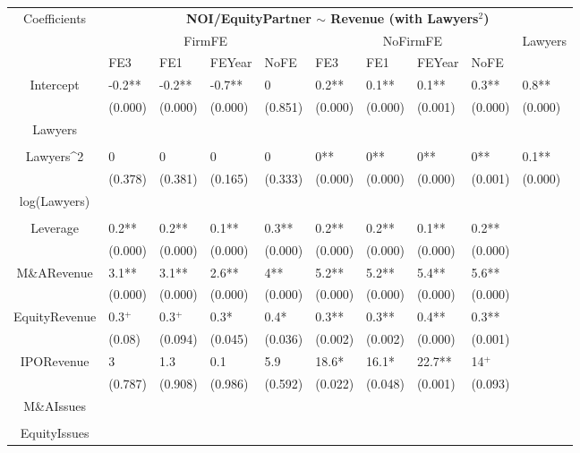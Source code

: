 \documentclass{article}
\begin{document}
\begin{table}[H]
\centering
\begin{tabular}{|clllllllll|}
\hline
\multirow{3}{*}{Coefficients} & \multicolumn{9}{c|}{\textbf{NOI/EquityPartner $\sim$ Revenue (with Lawyers$^2$)}} \\
\cline{2-10}
& \multicolumn{4}{c}{FirmFE} & \multicolumn{4}{c}{NoFirmFE} & \multirow{2}{*}{Lawyers} \\
\cline{2-9}
& FE3 & FE1 & FEYear & NoFE & FE3 & FE1 & FEYear & NoFE &  \\
\hline
 
Intercept & -0.2** & -0.2** & -0.7** & 0 & 0.2** & 0.1** & 0.1** & 0.3** & 0.8** \\ 
   & (0.000) & (0.000) & (0.000) & (0.851) & (0.000) & (0.000) & (0.001) & (0.000) & (0.000) \\ 
  Lawyers &  &  &  &  &  &  &  &  &  \\ 
   &  &  &  &  &  &  &  &  &  \\ 
  Lawyers^2 & 0 & 0 & 0 & 0 & 0** & 0** & 0** & 0** & 0.1** \\ 
   & (0.378) & (0.381) & (0.165) & (0.333) & (0.000) & (0.000) & (0.000) & (0.001) & (0.000) \\ 
  log(Lawyers) &  &  &  &  &  &  &  &  &  \\ 
   &  &  &  &  &  &  &  &  &  \\ 
  Leverage & 0.2** & 0.2** & 0.1** & 0.3** & 0.2** & 0.2** & 0.1** & 0.2** &  \\ 
   & (0.000) & (0.000) & (0.000) & (0.000) & (0.000) & (0.000) & (0.000) & (0.000) &  \\ 
  M\&ARevenue & 3.1** & 3.1** & 2.6** & 4** & 5.2** & 5.2** & 5.4** & 5.6** &  \\ 
   & (0.000) & (0.000) & (0.000) & (0.000) & (0.000) & (0.000) & (0.000) & (0.000) &  \\ 
  EquityRevenue & 0.3$^{+}$ & 0.3$^{+}$ & 0.3* & 0.4* & 0.3** & 0.3** & 0.4** & 0.3** &  \\ 
   & (0.08) & (0.094) & (0.045) & (0.036) & (0.002) & (0.002) & (0.000) & (0.001) &  \\ 
  IPORevenue & 3 & 1.3 & 0.1 & 5.9 & 18.6* & 16.1* & 22.7** & 14$^{+}$ &  \\ 
   & (0.787) & (0.908) & (0.986) & (0.592) & (0.022) & (0.048) & (0.001) & (0.093) &  \\ 
  M\&AIssues &  &  &  &  &  &  &  &  &  \\ 
   &  &  &  &  &  &  &  &  &  \\ 
  EquityIssues &  &  &  &  &  &  &  &  &  \\ 

\end{tabular}
\end{table}
\end{document}
